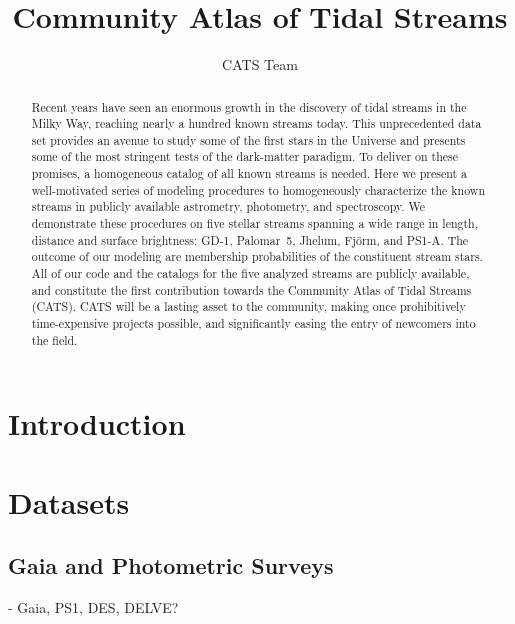 \documentclass[twocolumn]{aastex63}
\begin{document}
\sloppy\sloppypar\raggedbottom\frenchspacing %

\title{Community Atlas of Tidal Streams}


\author{CATS Team}



\begin{abstract}\noindent %
Recent years have seen an enormous growth in the discovery of tidal streams in the Milky Way, reaching nearly a hundred known streams today.
This unprecedented data set provides an avenue to study some of the first stars in the Universe and presents some of the most stringent tests of the dark-matter paradigm.
To deliver on these promises, a homogeneous catalog of all known streams is needed.
Here we present a well-motivated series of modeling procedures to homogeneously characterize the known streams in publicly available astrometry, photometry, and spectroscopy.
We demonstrate these procedures on five stellar streams spanning a wide range in length, distance and surface brightness: GD-1, Palomar~5, Jhelum, Fj\" orm, and PS1-A.
The outcome of our modeling are membership probabilities of the constituent stream stars.
All of our code and the catalogs for the five analyzed streams are publicly available, and constitute the first contribution towards the Community Atlas of Tidal Streams (CATS).
CATS will be a lasting asset to the community, making once prohibitively time-expensive projects possible, and significantly easing the entry of newcomers into the field.
\end{abstract}

\section{Introduction}

\section{Datasets}

\subsection{Gaia and Photometric Surveys}
 - Gaia, PS1, DES, DELVE?
\end{document}
